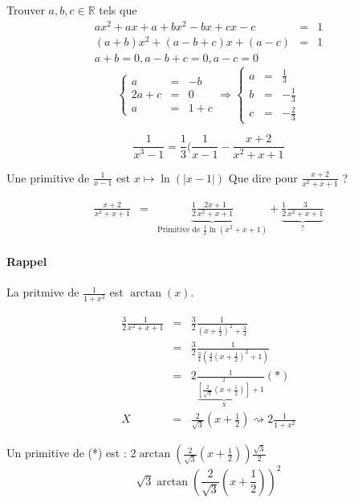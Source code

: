 			Trouver $a, b, c \in \mathbb{R}$ tels que \[\begin{array}{rcl}
					ax^2 + ax + a + bx^2 - bx + cx - c &=& 1 \\
					(a+b)x^2 + (a-b+c)x + (a-c) &=& 1 \\
				a+b = 0, a-b+c = 0, a-c = 0\end{array}
			\]
			\[\left\{\begin{array}{rcl}
						a &=& -b \\
						2a + c &=& 0 \\
					a&=& 1 + c \end{array}\right.
						\Rightarrow \left\{\begin{array}{rcl}
								a&=& \frac{1}{3} \\
								b &=& -\frac{1}{3} \\
						c &=& - \frac{2}{3}\end{array}\right.\]

								\[\frac{1}{x^3 -1} = \frac{1}{3}(\frac{1}{x-1} - \frac{x+2}{x^2 +x + 1}\]

Une primitive de $\frac{1}{x-1}$ est $x \mapsto \ln(|x-1|)$
Que dire pour $\frac{x+2}{x^2 + x + 1}$ ? 

\[\begin{array}{rcl}
\frac{x+2}{x^2 + x + 1} &=& \underbrace{\frac{1}{2}\frac{2x+1}{x^2 + x + 1}}_{\text{Primitive de } \frac{1}{2} \ln(x^2 + x + 1)} + \underbrace{\frac{1}{2} \frac{3}{x^2 + x + 1} }_{\text{?}}\end{array}\]

		\paragraph{Rappel} La pritmive de $\frac{1}{1+x^2}$ est $\arctan (x)$.

		\[\begin{array}{rcl}
				\frac{3}{2}\frac{1}{x^2 + x + 1} &=& \frac{3}{2}\frac{1}{(x+\frac{1}{2})^2 + \frac{3}{4}} \\
									   &=& \frac{3}{2} \frac{1}{\frac{3}{4}(\frac{4}{3}(x+\frac{1}{2})^2 + 1)} \\
									   &=& 2\frac{1}{\underbrace{[\frac{2}{\sqrt{3}}(x+\frac{1}{2})]}_{X}^2 + 1} (*)\\
				X &=& \frac{2}{\sqrt{3}}(x+\frac{1}{2}) \rightsquigarrow 2\frac{1}{1+x^2}
		\end{array}\]

		Un primitive de (*) est : $2\arctan (\frac{2}{\sqrt{3}}(x+\frac{1}{2})) \frac{\sqrt{3}}{2}$ ~\\
		\[\sqrt{3}\arctan(\frac{2}{\sqrt{3}}(x+\frac{1}{2}))^2\]
